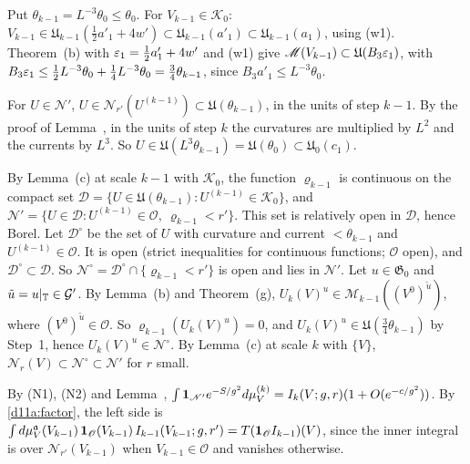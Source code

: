 \begin{detail}\label{d11a:A14d}
\begin{step}
Put $\theta_{k-1}=L^{-3}\theta_0\le\theta_0$. For $V_{k-1}\in\mathcal K_0$: $V_{k-1}\in\mathfrak U_{k-1}(\frac12a'_1+4w')\subset\mathfrak U_{k-1}(a'_1)\subset\mathfrak U_{k-1}(a_1)$, using (w1). Theorem~(b) with $\varepsilon_1=\frac12a'_1+4w'$ and (w1) give $\mathscr M(V_{k-1})\subset\mathfrak U(B_3\varepsilon_1)$, with $B_3\varepsilon_1\le\frac12L^{-3}\theta_0+\frac14L^{-3}\theta_0=\frac34\theta_{k-1}$, since $B_3a'_1\le L^{-3}\theta_0$.
\end{step}
\begin{step}[(N1)]
For $U\in\mathscr N'$, $U\in\mathscr N_{r'}(U^{(k-1)})\subset\mathfrak U(\theta_{k-1})$, in the units of step $k-1$. By the proof of Lemma~, in the units of step $k$ the curvatures are multiplied by $L^2$ and the currents by $L^3$. So $U\in\mathfrak U(L^3\theta_{k-1})=\mathfrak U(\theta_0)\subset\mathfrak U_0(c_1)$.
\end{step}
\begin{step}[(N2)]
By Lemma~(c) at scale $k-1$ with $\mathcal K_0$, the function $\varrho_{k-1}$ is continuous on the compact set $\mathcal D=\{U\in\mathfrak U(\theta_{k-1}):U^{(k-1)}\in\mathcal K_0\}$, and $\mathscr N'=\{U\in\mathcal D:U^{(k-1)}\in\mathscr O,\ \varrho_{k-1}<r'\}$. This set is relatively open in $\mathcal D$, hence Borel. Let $\mathcal D^\circ$ be the set of $U$ with curvature and current $<\theta_{k-1}$ and $U^{(k-1)}\in\mathscr O$. It is open (strict inequalities for continuous functions; $\mathscr O$ open), and $\mathcal D^\circ\subset\mathcal D$. So $\mathscr N^\circ=\mathcal D^\circ\cap\{\varrho_{k-1}<r'\}$ is open and lies in $\mathscr N'$. Let $u\in\mathfrak G_0$ and $\tilde u=u|_\mathbb T\in\mathcal G'$. By Lemma~(b) and Theorem~(g), $U_k(V)^u\in\mathscr M_{k-1}((V^0)^{\tilde u})$, where $(V^0)^{\tilde u}\in\mathscr O$. So $\varrho_{k-1}(U_k(V)^u)=0$, and $U_k(V)^u\in\mathfrak U(\frac34\theta_{k-1})$ by Step~1, hence $U_k(V)^u\in\mathscr N^\circ$. By Lemma~(c) at scale $k$ with $\{V\}$, $\mathscr N_r(V)\subset\mathscr N^\circ\subset\mathscr N'$ for $r$ small.
\end{step}
\begin{step}[Reduction]
By (N1), (N2) and Lemma~, $\int\mathbf 1_{\mathscr N'}e^{-S/g^2}d\mu^{(k)}_V=I_k(V;g,r)(1+O(e^{-c/g^2}))$. By \eqref{d11a:factor}, the left side is $\int d\mu^{\mathfrak a}_V(V_{k-1})\,\mathbf 1_{\mathscr O}(V_{k-1})\,I_{k-1}(V_{k-1};g,r')=T(\mathbf 1_{\mathscr O}I_{k-1})(V)$, since the inner integral is over $\mathscr N_{r'}(V_{k-1})$ when $V_{k-1}\in\mathscr O$ and vanishes otherwise.
\end{step}
\end{detail}

